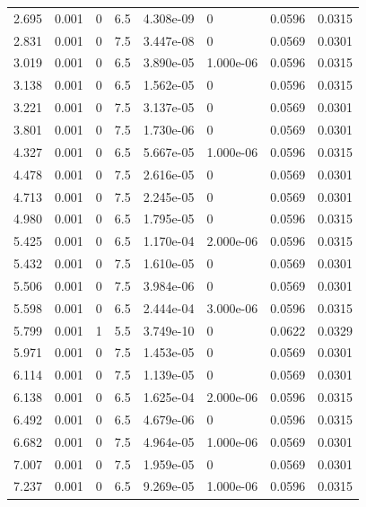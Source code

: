 \documentclass[preview]{standalone}
\begin{document}
{{\begin{tabular}{L{1.2cm}C{1.2cm} C{0.3cm}C{0.5cm} C{1.4cm}C{1.4cm} C{1.4cm}C{1.4cm}}
  2.695  &  0.001  & 0     & 6.5 &  4.308e-09  & 0  & 0.0596 &  0.0315   \\ 
  2.831  &  0.001  & 0     & 7.5 &  3.447e-08  & 0  & 0.0569 &  0.0301   \\ 
  3.019  &  0.001  & 0     & 6.5 &  3.890e-05  & 1.000e-06  & 0.0596 &  0.0315   \\ 
  3.138  &  0.001  & 0     & 6.5 &  1.562e-05  & 0  & 0.0596 &  0.0315   \\ 
  3.221  &  0.001  & 0     & 7.5 &  3.137e-05  & 0  & 0.0569 &  0.0301   \\ 
  3.801  &  0.001  & 0     & 7.5 &  1.730e-06  & 0  & 0.0569 &  0.0301   \\ 
  4.327  &  0.001  & 0     & 6.5 &  5.667e-05  & 1.000e-06  & 0.0596 &  0.0315   \\ 
  4.478  &  0.001  & 0     & 7.5 &  2.616e-05  & 0  & 0.0569 &  0.0301   \\ 
  4.713  &  0.001  & 0     & 7.5 &  2.245e-05  & 0  & 0.0569 &  0.0301   \\ 
  4.980  &  0.001  & 0     & 6.5 &  1.795e-05  & 0  & 0.0596 &  0.0315   \\ 
  5.425  &  0.001  & 0     & 6.5 &  1.170e-04  & 2.000e-06  & 0.0596 &  0.0315   \\ 
  5.432  &  0.001  & 0     & 7.5 &  1.610e-05  & 0  & 0.0569 &  0.0301   \\ 
  5.506  &  0.001  & 0     & 7.5 &  3.984e-06  & 0  & 0.0569 &  0.0301   \\ 
  5.598  &  0.001  & 0     & 6.5 &  2.444e-04  & 3.000e-06  & 0.0596 &  0.0315   \\ 
  5.799  &  0.001  & 1     & 5.5 &  3.749e-10  & 0  & 0.0622 &  0.0329   \\ 
  5.971  &  0.001  & 0     & 7.5 &  1.453e-05  & 0  & 0.0569 &  0.0301   \\ 
  6.114  &  0.001  & 0     & 7.5 &  1.139e-05  & 0  & 0.0569 &  0.0301   \\ 
  6.138  &  0.001  & 0     & 6.5 &  1.625e-04  & 2.000e-06  & 0.0596 &  0.0315   \\ 
  6.492  &  0.001  & 0     & 6.5 &  4.679e-06  & 0  & 0.0596 &  0.0315   \\ 
  6.682  &  0.001  & 0     & 7.5 &  4.964e-05  & 1.000e-06  & 0.0569 &  0.0301   \\ 
  7.007  &  0.001  & 0     & 7.5 &  1.959e-05  & 0  & 0.0569 &  0.0301   \\ 
  7.237  &  0.001  & 0     & 6.5 &  9.269e-05  & 1.000e-06  & 0.0596 &  0.0315   \\ 

\end{tabular}}}
\end{document}
